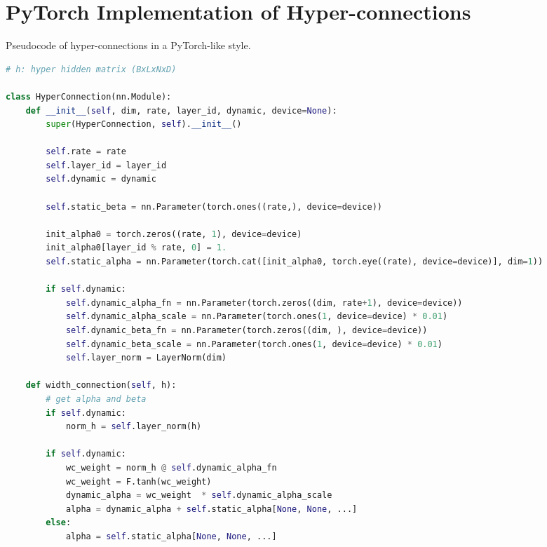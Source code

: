 \section{PyTorch Implementation of Hyper-connections}
\begin{algorithm}[h]
\caption{Pseudocode of hyper-connections in a PyTorch-like style.}
\label{alg:torch_hc}
\algcomment{\fontsize{7.2pt}{0em}\selectfont 
}
\begin{lstlisting}[language=python]
# h: hyper hidden matrix (BxLxNxD)

class HyperConnection(nn.Module):
    def __init__(self, dim, rate, layer_id, dynamic, device=None):
        super(HyperConnection, self).__init__()

        self.rate = rate
        self.layer_id = layer_id
        self.dynamic = dynamic

        self.static_beta = nn.Parameter(torch.ones((rate,), device=device))

        init_alpha0 = torch.zeros((rate, 1), device=device)
        init_alpha0[layer_id % rate, 0] = 1.
        self.static_alpha = nn.Parameter(torch.cat([init_alpha0, torch.eye((rate), device=device)], dim=1))
       
        if self.dynamic:
            self.dynamic_alpha_fn = nn.Parameter(torch.zeros((dim, rate+1), device=device))
            self.dynamic_alpha_scale = nn.Parameter(torch.ones(1, device=device) * 0.01)
            self.dynamic_beta_fn = nn.Parameter(torch.zeros((dim, ), device=device))
            self.dynamic_beta_scale = nn.Parameter(torch.ones(1, device=device) * 0.01)
            self.layer_norm = LayerNorm(dim)
    
    def width_connection(self, h):
        # get alpha and beta
        if self.dynamic:
            norm_h = self.layer_norm(h)
        
        if self.dynamic:
            wc_weight = norm_h @ self.dynamic_alpha_fn
            wc_weight = F.tanh(wc_weight)
            dynamic_alpha = wc_weight  * self.dynamic_alpha_scale
            alpha = dynamic_alpha + self.static_alpha[None, None, ...]
        else:
            alpha = self.static_alpha[None, None, ...]


\end{lstlisting}
\end{algorithm}
